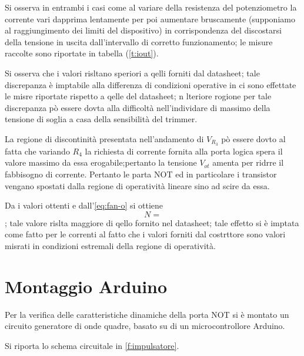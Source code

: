 \documentclass[a4paper,11pt]{article}
\newcommand{\tab}[1]{tabella (\ref{t:#1})} %
\begin{document}
Si osserva in entrambi i casi come al variare della resistenza del
potenziometro la corrente vari dapprima lentamente per poi aumentare
bruscamente (supponiamo al raggiungimento dei limiti del dispositivo) in
corrispondenza del discostarsi della tensione in uscita dall'intervallo di
corretto funzionamento; le misure raccolte sono riportate in \tab{iout}.



Si osserva che i valori risltano speriori a qelli forniti dal datasheet;
tale discrepanza è imptabile alla differenza di condizioni operative in ci sono effettate le misre riportate rispetto a qelle del datasheet;
n lteriore rogione per tale discrepanza pò essere dovta alla difficoltà nell'individare di massimo della tensione di soglia a casa della sensibilità del trimmer.

La regione di discontinità presentata nell'andamento di $V_{R_{3}}$
pò essere dovto al fatta che variando $R_{4}$ la richiesta di corrente fornita alla porta logica spera il valore massimo da essa erogabile;pertanto la tensione $V_{ot}$ amenta per ridrre il fabbisogno di corrente.
Pertanto le parta NOT ed in particolare i transistor vengano spostati dalla regione di operatività lineare sino ad scire da  essa.

Da i valori ottenti e dall'\eqref{eq:fan-o} si ottiene $$N=$$; tale valore rislta maggiore di qello fornito nel datasheet; tale effetto si è imptata come fatto per le correnti al fatto che i valori forniti dal costrttore sono valori misrati in condizioni estremali della regione di operatività.

\section{Montaggio Arduino}
Per la verifica delle caratteristiche dinamiche della porta NOT si è montato un circuito generatore di onde quadre, basato su di un microcontrollore Arduino. 

Si riporta lo schema circuitale in \figurename{ \ref{f:impulsatore}}. 
\end{document}
